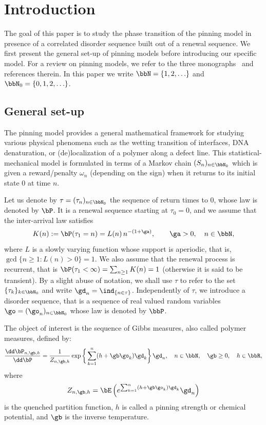 \section{Introduction}

The goal of this paper is to study the phase transition of the pinning model in presence of a correlated disorder sequence built out of a renewal sequence. We first present the general set-up of pinning models before introducing our specific model. For a review on pinning models, we refer to the three monographs~\cite{Gi2007, Gi2011, dH09} and references therein. In this paper we write $\bbN = \{1, 2, \ldots\}$ and $\bbN_0 = \{0, 1, 2,\ldots\}$.

\subsection{General set-up}

The pinning model provides a general mathematical framework for studying various physical phenomena such as the wetting transition of interfaces, DNA denaturation, or (de)localization of a polymer along a defect line. This statistical-mechanical model is formulated in terms of a Markov chain $(S_n)_{n\in\bbN_0}$ which is given a reward/penalty $\omega_n$ (depending on the sign) when it returns to its initial state $0$ at time $n$.

Let us denote by $\tau = (\tau_n)_{n\in\bbN_0}$ the sequence of return times to $0$, whose law is denoted by $\bP$. It is a renewal sequence starting at $\tau_0 = 0$, and we assume that the inter-arrival law satisfies
\begin{equation}\label{eq:defK_regvar}
K(n) := \bP(\tau_1 = n) = L(n) \, n^{- (1 + \ga)},\qquad \ga > 0,\quad n\in\bbN,
\end{equation}
where $L$ is a slowly varying function whose support is aperiodic, that is, $\gcd\{n \geq 1 \colon L(n) > 0\}= 1$. We also assume that the renewal process is recurrent, that is $\bP(\tau_1 < \infty) = \sum_{n\ge 1} K(n) = 1$ (otherwise it is said to be transient). By a slight abuse of notation, we shall use $\tau$ to refer to the set $\{\tau_k\}_{k\in\bbN_0}$ and write $\gd_n = \ind_{\{n\in\tau\}}$. Independently of $\tau$, we introduce a disorder sequence, that is a sequence of real valued random variables $\go = (\go_n)_{n\in \bbN_0}$ whose law is denoted by $\bbP$.

The object of interest is the sequence of Gibbs measures, also called polymer measures, defined by:
\begin{equation}\label{eq:defquemeas}
\frac{\dd \bP_{n,\gb,h}}{\dd \bP} = \frac{1}{Z_{n,\gb,h}} \exp \bigg\{\sum_{k=1}^n (h + \gb \go_k)\gd_k \bigg\} \,\gd_n, \quad n \in \bbN, \quad \gb \geq 0, \quad h \in \bbR,
\end{equation}
where
\begin{equation}\label{eq:defquepf}
Z_{n,\gb,h} = \bE \left(e^{\sum_{k=1}^n (h + \gb \go_k) \gd_k} \gd_n \right)
\end{equation}
is the quenched partition function, $h$ is called a pinning strength or chemical potential, and $\gb$ is the inverse temperature.

